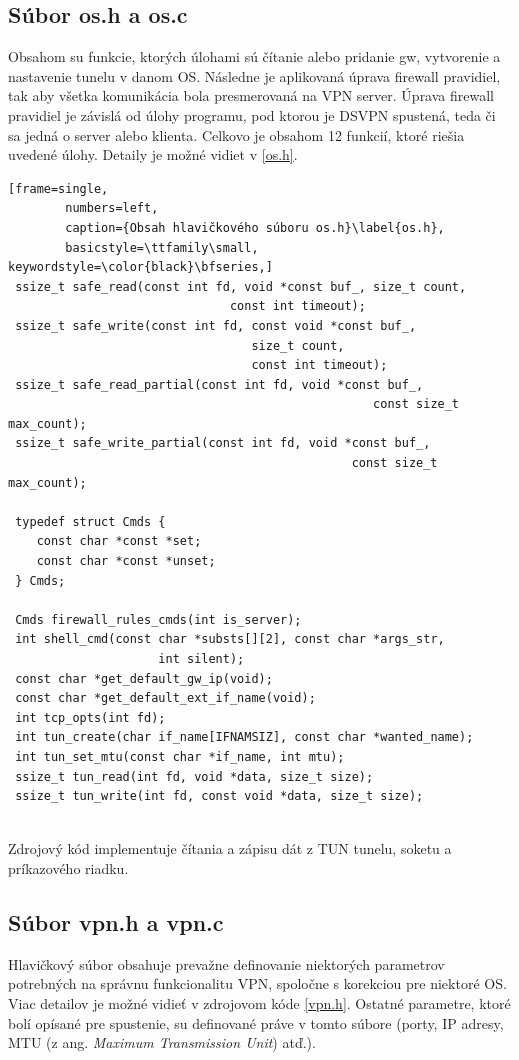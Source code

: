  \subsection{Súbor os.h a os.c}
Obsahom su funkcie, ktorých úlohami sú čítanie alebo pridanie \acrshort{gw}, vytvorenie a nastavenie tunelu v danom OS. Následne je aplikovaná úprava firewall pravidiel, tak aby všetka komunikácia bola presmerovaná na VPN server. Úprava firewall pravidiel je závislá od úlohy programu, pod ktorou je DSVPN spustená, teda či sa jedná o server alebo klienta. 
Celkovo je obsahom 12 funkcií, ktoré riešia uvedené úlohy. Detaily je možné vidiet v \ref{os.h}.
 
 \begin{minipage}{\linewidth} 	
	\begin{lstlisting}[frame=single,
		numbers=left,
		caption={Obsah hlavičkového súboru os.h}\label{os.h},
		basicstyle=\ttfamily\small, keywordstyle=\color{black}\bfseries,]
 ssize_t safe_read(const int fd, void *const buf_, size_t count, 
 						       const int timeout);
 ssize_t safe_write(const int fd, const void *const buf_, 
 							      size_t count,
 							      const int timeout);
 ssize_t safe_read_partial(const int fd, void *const buf_,
 							 					   const size_t max_count);
 ssize_t safe_write_partial(const int fd, void *const buf_, 
 							    		     	const size_t max_count);
 
 typedef struct Cmds {
 	const char *const *set;
 	const char *const *unset;
 } Cmds;
 
 Cmds firewall_rules_cmds(int is_server);
 int shell_cmd(const char *substs[][2], const char *args_str,
 			         int silent);
 const char *get_default_gw_ip(void);
 const char *get_default_ext_if_name(void);
 int tcp_opts(int fd);
 int tun_create(char if_name[IFNAMSIZ], const char *wanted_name);
 int tun_set_mtu(const char *if_name, int mtu);
 ssize_t tun_read(int fd, void *data, size_t size);
 ssize_t tun_write(int fd, const void *data, size_t size); 
\end{lstlisting}
\end{minipage}\\ 
Zdrojový kód implementuje čítania a zápisu dát z TUN tunelu, soketu a príkazového riadku. 
 \subsection{Súbor vpn.h a vpn.c}
 Hlavičkový súbor obsahuje prevažne definovanie niektorých parametrov potrebných na správnu funkcionalitu VPN, spoločne s korekciou pre niektoré OS. Viac detailov je možné vidieť v zdrojovom kóde \ref{vpn.h}. Ostatné parametre, ktoré bolí opísané pre spustenie, su definované práve v tomto súbore (porty, IP adresy, MTU (z ang. \textit{Maximum Transmission Unit}) atď.).
 
